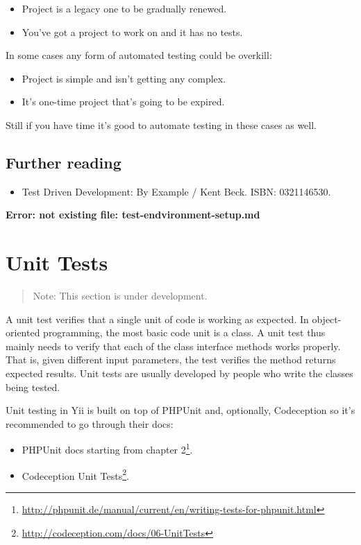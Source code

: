 \begin{itemize}
\item Project is a legacy one to be gradually renewed.
\item You've got a project to work on and it has no tests.
\end{itemize}
In some cases any form of automated testing could be overkill:

\begin{itemize}
\item Project is simple and isn't getting any complex.
\item It's one-time project that's going to be expired.
\end{itemize}
Still if you have time it's good to automate testing in these cases as well.

\subsection{Further reading}
\begin{itemize}
\item Test Driven Development: By Example / Kent Beck. ISBN: 0321146530.
\end{itemize}


\newpage\label{test-endvironment-setup.md}\textbf{Error: not existing file: test-endvironment-setup.md}\newpage
\label{test-unit.md}\section{Unit Tests}
\begin{quote}Note: This section is under development.

\end{quote}
A unit test verifies that a single unit of code is working as expected. In object-oriented programming, the most basic
code unit is a class. A unit test thus mainly needs to verify that each of the class interface methods works properly.
That is, given different input parameters, the test verifies the method returns expected results.
Unit tests are usually developed by people who write the classes being tested.

Unit testing in Yii is built on top of PHPUnit and, optionally, Codeception so it's recommended to go through their docs:

\begin{itemize}
\item PHPUnit docs starting from chapter 2\footnote{\url{http://phpunit.de/manual/current/en/writing-tests-for-phpunit.html}}.
\item Codeception Unit Tests\footnote{\url{http://codeception.com/docs/06-UnitTests}}.
\end{itemize}
